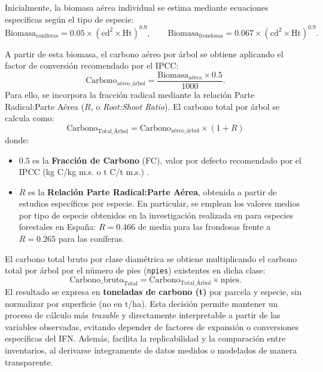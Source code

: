 \begin{itemize}
    Inicialmente, la biomasa aérea individual se estima mediante ecuaciones específicas según el tipo de especie:
    \[
    \text{Biomasa}_{\text{coníferas}} = 0.05 \times (\text{cd}^2 \times \text{Ht})^{0.9}, \qquad
    \text{Biomasa}_{\text{frondosas}} = 0.067 \times (\text{cd}^2 \times \text{Ht})^{0.9}.
    \]

        A partir de esta biomasa, el carbono aéreo por árbol se obtiene aplicando el factor de conversión recomendado por el IPCC:
    \[
    \text{Carbono}_{\text{aéreo\_árbol}} = \frac{\text{Biomasa}_{\text{aérea}} \times 0.5}{1000}.
    \]
        Para ello, se incorpora la fracción radical mediante la relación Parte Radical:Parte Aérea ($R$, o \textit{Root:Shoot Ratio}). El carbono total por árbol se calcula como:
    \[
    \text{Carbono}_{\text{Total\_Árbol}} = \text{Carbono}_{\text{aéreo\_árbol}} \times (1 + R)
    \]
    donde:
    \begin{itemize}
        \item $0.5$ es la \textbf{Fracción de Carbono} (FC), valor por defecto recomendado por el IPCC (kg C/kg m.s. o t C/t m.s.) \cite{ipcc2006}.
        \item $R$ es la \textbf{Relación Parte Radical:Parte Aérea}, obtenida a partir de estudios específicos por especie. En particular, se emplean los valores medios por tipo de especie obtenidos en la investigación realizada en \cite{ruizpeinado2011} para especies forestales en España: $R = 0.466$ de media para las frondosas frente a $R = 0.265$ para las coníferas. 
    \end{itemize}

    El carbono total bruto por clase diamétrica se obtiene multiplicando el carbono total por árbol por el número de pies (\texttt{npies}) existentes en dicha clase:
    \[
    \text{Carbono\_bruto}_{\text{Total}} = \text{Carbono}_{\text{Total\_Árbol}} \times \text{npies}.
    \]
    El resultado se expresa en \textbf{toneladas de carbono (t)} por parcela y especie, sin normalizar por superficie (no en t/ha).  Esta decisión permite mantener un proceso de cálculo más \textit{trazable} y directamente interpretable a partir de las variables observadas, evitando depender de factores de expansión o conversiones específicas del IFN.  Además, facilita la replicabilidad y la comparación entre inventarios, al derivarse íntegramente de datos medidos o modelados de manera transparente.
    
    \medskip


\end{itemize}
